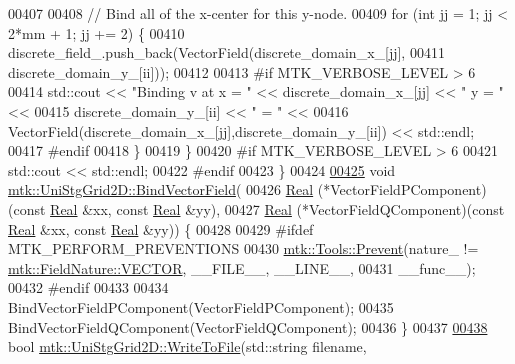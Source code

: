 \begin{DoxyCode}
00407 
00408     \textcolor{comment}{// Bind all of the x-center for this y-node.}
00409     \textcolor{keywordflow}{for} (\textcolor{keywordtype}{int} jj = 1; jj < 2*mm + 1; jj += 2) \{
00410       discrete\_field\_.push\_back(VectorField(discrete\_domain\_x\_[jj],
00411                                             discrete\_domain\_y\_[ii]));
00412 
00413 \textcolor{preprocessor}{      #if MTK\_VERBOSE\_LEVEL > 6}
00414       std::cout << \textcolor{stringliteral}{"Binding v at x = "} << discrete\_domain\_x\_[jj] << \textcolor{stringliteral}{" y = "} <<
00415         discrete\_domain\_y\_[ii] << \textcolor{stringliteral}{" = "} <<
00416         VectorField(discrete\_domain\_x\_[jj],discrete\_domain\_y\_[ii]) << std::endl;
00417 \textcolor{preprocessor}{      #endif}
00418     \}
00419   \}
00420 \textcolor{preprocessor}{  #if MTK\_VERBOSE\_LEVEL > 6}
00421   std::cout << std::endl;
00422 \textcolor{preprocessor}{  #endif}
00423 \}
00424 
\hypertarget{mtk__uni__stg__grid__2d_8cc_source_l00425}{}\hyperlink{classmtk_1_1UniStgGrid2D_ae274b24672e9bd6075bf38b015bd9083}{00425} \textcolor{keywordtype}{void} \hyperlink{classmtk_1_1UniStgGrid2D_ae274b24672e9bd6075bf38b015bd9083}{mtk::UniStgGrid2D::BindVectorField}(
00426   \hyperlink{group__c01-roots_gac080bbbf5cbb5502c9f00405f894857d}{Real} (*VectorFieldPComponent)(\textcolor{keyword}{const} \hyperlink{group__c01-roots_gac080bbbf5cbb5502c9f00405f894857d}{Real} &xx, \textcolor{keyword}{const} \hyperlink{group__c01-roots_gac080bbbf5cbb5502c9f00405f894857d}{Real} &yy),
00427   \hyperlink{group__c01-roots_gac080bbbf5cbb5502c9f00405f894857d}{Real} (*VectorFieldQComponent)(\textcolor{keyword}{const} \hyperlink{group__c01-roots_gac080bbbf5cbb5502c9f00405f894857d}{Real} &xx, \textcolor{keyword}{const} \hyperlink{group__c01-roots_gac080bbbf5cbb5502c9f00405f894857d}{Real} &yy)) \{
00428 
00429 \textcolor{preprocessor}{  #ifdef MTK\_PERFORM\_PREVENTIONS}
00430   \hyperlink{classmtk_1_1Tools_a332324c6f25e66be9dff48c5987a3b9f}{mtk::Tools::Prevent}(nature\_ != \hyperlink{namespacemtk_ga4c54f2a329cfb4e56213b02a259d19e2a87752381b583740610f1dfeb07fdad7e}{mtk::FieldNature::VECTOR}, 
      \_\_FILE\_\_, \_\_LINE\_\_,
00431 \_\_func\_\_);
00432 \textcolor{preprocessor}{  #endif}
00433 
00434   BindVectorFieldPComponent(VectorFieldPComponent);
00435   BindVectorFieldQComponent(VectorFieldQComponent);
00436 \}
00437 
\hypertarget{mtk__uni__stg__grid__2d_8cc_source_l00438}{}\hyperlink{classmtk_1_1UniStgGrid2D_a1787a79e4bcee6b89c681dc7e5e2d7bc}{00438} \textcolor{keywordtype}{bool} \hyperlink{classmtk_1_1UniStgGrid2D_a1787a79e4bcee6b89c681dc7e5e2d7bc}{mtk::UniStgGrid2D::WriteToFile}(std::string filename,

\end{DoxyCode}
